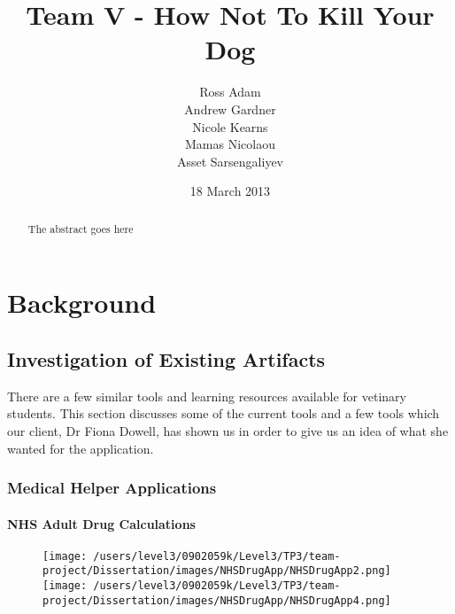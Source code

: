 \documentclass{l3proj}
\begin{document}
\title{Team V - How Not To Kill Your Dog}
\author{Ross Adam \\
        Andrew Gardner \\
        Nicole Kearns \\
        Mamas Nicolaou \\
        Asset Sarsengaliyev}
\date{18 March 2013}
\maketitle
\begin{abstract}

The abstract goes here

\end{abstract}
\educationalconsent
\tableofcontents

\chapter{Background}
\label{background}

\section{Investigation of Existing Artifacts}


There are a few similar tools and learning resources available for vetinary students. This section discusses some of the current tools and a few tools which our client, Dr Fiona Dowell, has shown us in order to give us an idea of what she wanted for the application.

\subsection{Medical Helper Applications}


\subsubsection{NHS Adult Drug Calculations}

\begin{figure}[!htb]
  \texttt{[image: /users/level3/0902059k/Level3/TP3/team-project/Dissertation/images/NHSDrugApp/NHSDrugApp2.png]}
\endminipage\hfill
{}
  \texttt{[image: /users/level3/0902059k/Level3/TP3/team-project/Dissertation/images/NHSDrugApp/NHSDrugApp4.png]}
\endminipage
\end{figure}
\end{document}
